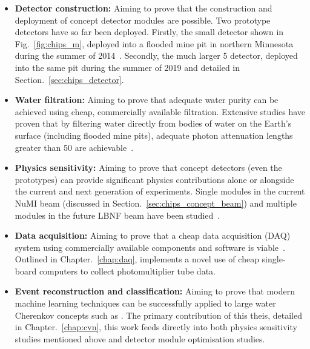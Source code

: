 \begin{itemize}
    \item \textbf{Detector construction:} Aiming to prove that the construction and deployment of
          \chips concept detector modules are possible. Two prototype detectors have so far been
          deployed. Firstly, the small \chipsm detector shown in Fig.~\ref{fig:chips_m}, deployed
          into a flooded mine pit in northern Minnesota during the summer of 2014~\cite{perch2015,
              pfutznerProto2017, pfutzner2017}. Secondly, the much larger \unit{5}{}
          \chipsfive detector, deployed into the same pit during the summer of 2019 and detailed
          in Section.~\ref{sec:chips_detector}.

    \item \textbf{Water filtration:} Aiming to prove that adequate water purity can be achieved
          using cheap, commercially available filtration. Extensive studies have proven that by
          filtering water directly from bodies of water on the Earth's surface (including flooded
          mine pits), adequate photon attenuation lengths greater than \unit{50}{} are
          achievable~\cite{amat2017, campbell2020}.

    \item \textbf{Physics sensitivity:} Aiming to prove that \chips concept detectors (even the
          prototypes) can provide significant physics contributions alone or alongside the current
          and next generation of experiments. Single modules in the current NuMI beam (discussed
          in Section.~\ref{sec:chips_concept_beam}) and multiple modules in the future LBNF beam
          have been studied~\cite{pfutzner2017, adde2016, lang2015}.

    \item \textbf{Data acquisition:} Aiming to prove that a cheap data acquisition (DAQ) system
          using commercially available components and software is viable~\cite{eijk2018}. Outlined
          in Chapter.~\ref{chap:daq}, \chips implements a novel use of cheap single-board
          computers to collect photomultiplier tube data.

    \item \textbf{Event reconstruction and classification:} Aiming to prove that modern machine
          learning techniques can be successfully applied to large water Cherenkov concepts such
          as \chips. The primary contribution of this theis, detailed in Chapter.~\ref{chap:cvn},
          this work feeds directly into both physics sensitivity studies mentioned above and
          detector module optimisation studies.
\end{itemize}

